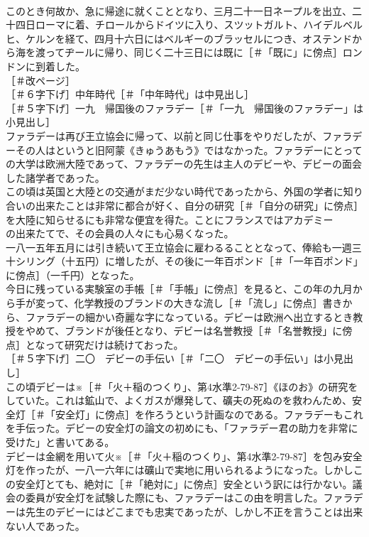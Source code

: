 \documentclass[8pt]{extreport}
\begin{document}
\begin{CJK}{UTF8}{min}
\\	このとき何故か、急に帰途に就くこととなり、三月二十一日ネープルを出立、二十四日ローマに着、チロールからドイツに入り、スツットガルト、ハイデルベルヒ、ケルンを経て、四月十六日にはベルギーのブラッセルにつき、オステンドから海を渡ってヂールに帰り、同じく二十三日には既に［＃「既に」に傍点］ロンドンに到着した。
\\	［＃改ページ］
\\	［＃６字下げ］中年時代［＃「中年時代」は中見出し］
\\	［＃５字下げ］一九　帰国後のファラデー［＃「一九　帰国後のファラデー」は小見出し］
\\	ファラデーは再び王立協会に帰って、以前と同じ仕事をやりだしたが、ファラデーその人はというと旧阿蒙《きゅうあもう》ではなかった。ファラデーにとっての大学は欧洲大陸であって、ファラデーの先生は主人のデビーや、デビーの面会した諸学者であった。
\\	この頃は英国と大陸との交通がまだ少ない時代であったから、外国の学者に知り合いの出来たことは非常に都合が好く、自分の研究［＃「自分の研究」に傍点］を大陸に知らせるにも非常な便宜を得た。ことにフランスではアカデミー
\\	の出来たてで、その会員の人々にも心易くなった。
\\	一八一五年五月には引き続いて王立協会に雇わるることとなって、俸給も一週三十シリング（十五円）に増したが、その後に一年百ポンド［＃「一年百ポンド」に傍点］（一千円）となった。
\\	今日に残っている実験室の手帳［＃「手帳」に傍点］を見ると、この年の九月から手が変って、化学教授のブランドの大きな流し［＃「流し」に傍点］書きから、ファラデーの細かい奇麗な字になっている。デビーは欧洲へ出立するとき教授をやめて、ブランドが後任となり、デビーは名誉教授［＃「名誉教授」に傍点］となって研究だけは続けておった。
\\	［＃５字下げ］二〇　デビーの手伝い［＃「二〇　デビーの手伝い」は小見出し］
\\	この頃デビーは※［＃「火＋稲のつくり」、第4水準2-79-87］《ほのお》の研究をしていた。これは鉱山で、よくガスが爆発して、礦夫の死ぬのを救わんため、安全灯［＃「安全灯」に傍点］を作ろうという計画なのである。ファラデーもこれを手伝った。デビーの安全灯の論文の初めにも、「ファラデー君の助力を非常に受けた」と書いてある。
\\	デビーは金網を用いて火※［＃「火＋稲のつくり」、第4水準2-79-87］を包み安全灯を作ったが、一八一六年には礦山で実地に用いられるようになった。しかしこの安全灯とても、絶対に［＃「絶対に」に傍点］安全という訳には行かない。議会の委員が安全灯を試験した際にも、ファラデーはこの由を明言した。ファラデーは先生のデビーにはどこまでも忠実であったが、しかし不正を言うことは出来ない人であった。

\end{CJK}
\end{document}
